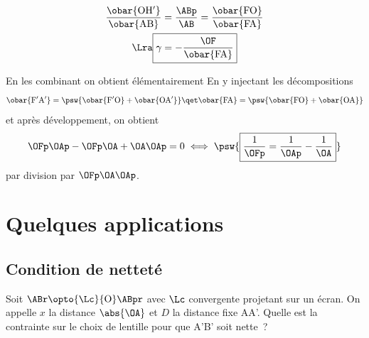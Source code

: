 \documentclass[../../main/main.tex]{subfiles}
\begin{document}
\begin{tcb}[label=demo:lent_rc, breakable]
\begin{isd}
{			\begin{gather*}
				\frac{\obar{\rm OH'}}{\obar{\rm AB}} = \frac{\ABp}{\AB} =
				\frac{\obar{\rm FO}}{\obar{\rm FA}}
				\\\Lra
				\boxed{\gamma = - \frac{\OF}{\obar{\rm FA}}}
			\end{gather*}
		}
	\end{isd}
	En les combinant on obtient élémentairement
	En y injectant les décompositions
	\begin{equation*}
		\obar{\rm F'A'} = \psw{
			\obar{\rm F'O} + \obar{\rm OA'}
		}
		\qet
		\obar{\rm FA} = \psw{
			\obar{\rm FO} + \obar{\rm OA}
		}
	\end{equation*}
	et après développement, on obtient
	\begin{equation*}
		\OFp\OAp - \OFp\OA + \OA\OAp = 0
		\iff
		\psw{
			\boxed{
				\frac{1}{\OFp} = \frac{1}{\OAp} - \frac{1}{\OA}
			}
		}
	\end{equation*}
	par division par $\OFp\OA\OAp$.
\end{tcb}

\section{Quelques applications}

\subsection{Condition de netteté}

Soit $\ABr \opto{\Lc}{\rm O} \ABpr$ avec $\Lc$ convergente projetant sur un écran. On
appelle $x$ la distance $ \abs{\OA}$ et $D$ la distance fixe AA'.
Quelle est la contrainte sur le choix de lentille pour que A'B' soit nette~?
\end{document}
